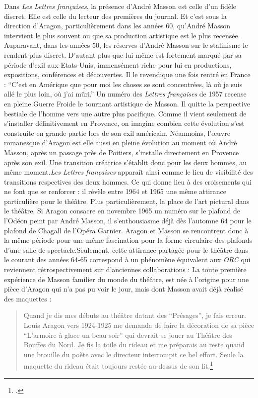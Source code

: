 	Dans \emph{Les Lettres françaises}, la présence d’André Masson est celle d’un fidèle discret. Elle est celle du lecteur des premières du journal. Et c’est sous la direction d’Aragon, particulièrement dans les années 60, qu’André Masson intervient le plus souvent ou que sa production artistique est le plus recensée. Auparavant, dans les années 50, les réserves d’André Masson sur le stalinisme le rendent plus discret. D’autant plus que lui-même est fortement marqué par sa période d’exil aux Etats-Unis, immensément riche pour lui en productions, expositions, conférences et découvertes. Il le revendique une fois rentré en France : \enquote{C’est en Amérique que pour moi les choses se sont concentrées, là où je suis allé le plus loin, où j’ai mûri.} Un numéro des \emph{Lettres françaises} de 1957 recense en pleine Guerre Froide le tournant artistique de Masson. Il quitte la perspective bestiale de l’homme vers une autre plus pacifique. Comme il vient seulement de s’installer définitivement en Provence, on imagine combien cette évolution s’est construite en grande partie lors de son exil américain. Néanmoins, l’\oe{}uvre romanesque d’Aragon est elle aussi en pleine évolution au moment où André Masson, après un passage près de Poitiers, s’installe directement en Provence après son exil. Une transition créatrice s’établit donc pour les deux hommes, au même moment.\emph{Les Lettres françaises} apparaît ainsi comme le lieu de visibilité des transitions respectives des deux hommes. Ce qui donne lieu à des croisements qui ne font que se renforcer : il révèle entre 1964 et 1965 une même attirance particulière pour le théâtre. Plus particulièrement, la place de l’art pictural dans le théâtre. Si Aragon consacre en novembre 1965 un numéro sur le plafond de l’Odéon peint par André Masson, il s’enthousiasme déjà dès l’automne 64 pour le plafond de Chagall de l’Opéra Garnier. Aragon et Masson se rencontrent donc à la même période pour une même fascination pour la forme circulaire des plafonds d’une salle de spectacle.Seulement, cette attirance partagée pour le théâtre dans le courant des années 64-65 correspond à un phénomène équivalent aux \emph{ORC} qui reviennent rétrospectivement sur d'anciennes collaborations : La toute première expérience de Masson familier du monde du théâtre, est née à l'origine pour une pièce d'Aragon qui n'a pas pu voir le jour, mais dont Masson avait déjà réalisé des maquettes : 
\begin{quote}
Quand je dis mes débuts au théâtre datant des \enquote{Présages}, je fais erreur. Louis Aragon vers 1924-1925 me demanda de faire la décoration de sa pièce \enquote{L'armoire à glace un beau soir} qui devrait se jouer au Théâtre des Bouffes du Nord. Je fis la toile du rideau et me préparais au reste quand une brouille du poète avec le directeur interrompit ce bel effort. Seule la maquette du rideau était toujours restée au-dessus de son lit.\footcite[p19]{catalogue}
\end{quote}
	
